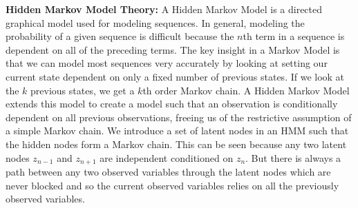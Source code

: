 \documentclass[11pt,letterpaper]{article}
\begin{document}
{\bf Hidden Markov Model Theory:} A Hidden Markov Model is a directed graphical model used for modeling sequences.
In general, modeling the probability of a given sequence is difficult because
the $n$th term in a sequence is dependent on all of the preceding terms. The key
insight in a Markov Model is that we can model most sequences very accurately
by looking at setting our current state dependent on only a fixed number of previous
states. If we look at the $k$ previous states, we get a $k$th order Markov chain.
A Hidden Markov Model extends this model to create a model such that an observation
is conditionally dependent on all previous observations, freeing us of the restrictive
assumption of a simple Markov chain. We introduce a set of latent nodes in an HMM such
that the hidden nodes form a Markov chain. This can be seen because any two latent nodes
$z_{n-1}$ and $z_{n+1}$ are independent conditioned on $z_n$. But there is always a path between any two
observed variables through the latent nodes which are never blocked and so the current
observed variables relies on all the previously observed variables\cite{bishop:607}.
\end{document}

